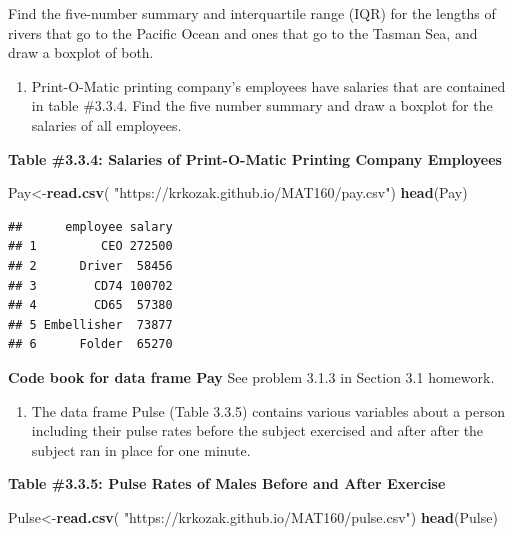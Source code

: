 \documentclass[
]{book}
\newenvironment{Shaded}{\begin{snugshade}}{\end{snugshade}}
\newcommand{\KeywordTok}[1]{\textcolor[rgb]{0.13,0.29,0.53}{\textbf{#1}}}
\newcommand{\NormalTok}[1]{#1}
\newcommand{\StringTok}[1]{\textcolor[rgb]{0.31,0.60,0.02}{#1}}
\providecommand{\tightlist}{%
  \setlength{\itemsep}{0pt}\setlength{\parskip}{0pt}}
\begin{document}
Find the five-number summary and interquartile range (IQR) for the lengths of rivers that go to the Pacific Ocean and ones that go to the Tasman Sea, and draw a boxplot of both.

\begin{enumerate}
\def\labelenumi{\arabic{enumi}.}
\setcounter{enumi}{6}
\tightlist
\item
  Print-O-Matic printing company's employees have salaries that are contained in table \#3.3.4. Find the five number summary and draw a boxplot for the salaries of all employees.
\end{enumerate}

\textbf{Table \#3.3.4: Salaries of Print-O-Matic Printing Company Employees}

\begin{Shaded}
\begin{Highlighting}[]
\NormalTok{Pay<-}\KeywordTok{read.csv}\NormalTok{(}
  \StringTok{"https://krkozak.github.io/MAT160/pay.csv"}\NormalTok{)}
\KeywordTok{head}\NormalTok{(Pay)}
\end{Highlighting}
\end{Shaded}

\begin{verbatim}
##      employee salary
## 1         CEO 272500
## 2      Driver  58456
## 3        CD74 100702
## 4        CD65  57380
## 5 Embellisher  73877
## 6      Folder  65270
\end{verbatim}

\textbf{Code book for data frame Pay} See problem 3.1.3 in Section 3.1 homework.

\begin{enumerate}
\def\labelenumi{\arabic{enumi}.}
\setcounter{enumi}{7}
\tightlist
\item
  The data frame Pulse (Table 3.3.5) contains various variables about a person including their pulse rates before the subject exercised and after after the subject ran in place for one minute.
\end{enumerate}

\textbf{Table \#3.3.5: Pulse Rates of Males Before and After Exercise}

\begin{Shaded}
\begin{Highlighting}[]
\NormalTok{Pulse<-}\KeywordTok{read.csv}\NormalTok{(}
  \StringTok{"https://krkozak.github.io/MAT160/pulse.csv"}\NormalTok{)}
\KeywordTok{head}\NormalTok{(Pulse)}
\end{Highlighting}
\end{Shaded}
\end{document}
